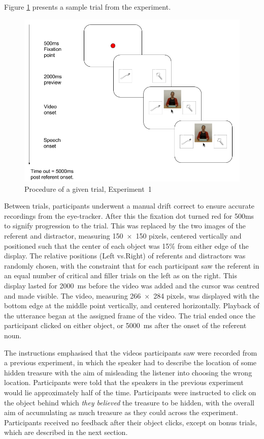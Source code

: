 \documentclass[a4paper,man,natbib]{apa6}
\begin{document}
Figure \ref{fig:v1_trial} presents a sample trial from the experiment. 
\begin{figure}[Ht]
  \centering
	\includegraphics[width=\linewidth]{./img/e7_trial.png}
  \caption{Procedure of a given trial, Experiment~1}
  \label{fig:v1_trial}
\end{figure}
Between trials, participants underwent a manual drift correct to ensure accurate recordings from the eye-tracker.
After this the fixation dot turned red for 500ms to signify progression to the trial. 
This was replaced by the two images of the referent and distractor, measuring 150~$\times$~150 pixels, centered vertically and positioned such that the center of each object was 15\% from either edge of the display. 
The relative positions (Left vs.\@ Right) of referents and distractors was randomly chosen, with the constraint that for each participant saw the referent in an equal number of critical and filler trials on the left as on the right.
This display lasted for 2000~ms before the video was added and the cursor was centred and made visible.
The video, measuring 266~$\times$~284 pixels, was displayed with the bottom edge at the middle point vertically, and centered horizontally.
Playback of the utterance began at the assigned frame of the video.
The trial ended once the participant clicked on either object, or 5000~ms after the onset of the referent noun.

The instructions emphasised that the videos participants saw were recorded from a previous experiment, in which the speaker had to describe the location of some hidden treasure with the aim of misleading the listener into choosing the wrong location.
Participants were told that the speakers in the previous experiment would lie approximately half of the time. 
Participants were instructed to click on the object behind which \textit{they believed} the treasure to be hidden, with the overall aim of accumulating as much treasure as they could across the experiment.
Participants received no feedback after their object clicks, except on bonus trials, which are described in the next section.
\end{document}
